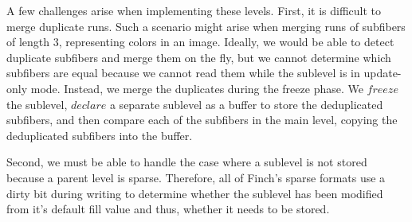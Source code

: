 A few challenges arise when implementing these levels. First, it is difficult to merge duplicate runs.
%
Such a scenario might arise when merging runs of subfibers of length 3, representing colors in an image.
%
Ideally, we would be able to detect duplicate subfibers and merge them on the fly, but we cannot determine which subfibers are equal because we cannot read them while the sublevel is in update-only mode.
%
Instead, we merge the duplicates during the freeze phase.
%
We $freeze$ the sublevel, $declare$ a separate sublevel as a buffer to store the deduplicated subfibers, and then compare each of the subfibers in the main level, copying the deduplicated subfibers into the buffer.

Second, we must be able to handle the case where a sublevel is not stored because a parent level is sparse.
%
Therefore, all of Finch's sparse formats use a dirty bit during writing to determine whether the sublevel has been modified from it's default fill value and thus, whether it needs to be stored.

